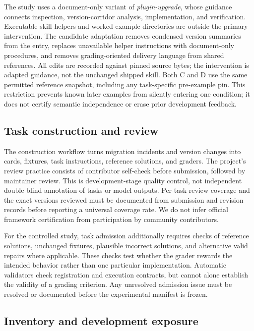 \documentclass[11pt]{article}
\begin{document}
The study uses a document-only variant of \emph{plugin-upgrade}, whose guidance connects inspection, version-corridor analysis, implementation, and verification.
Executable skill helpers and worked-example directories are outside the primary intervention.
The candidate adaptation removes condensed version summaries from the entry, replaces unavailable helper instructions with document-only procedures, and removes grading-oriented delivery language from shared references.
All edits are recorded against pinned source bytes; the intervention is adapted guidance, not the unchanged shipped skill.
Both C and D use the same permitted reference snapshot, including any task-specific pre-example pin.
This restriction prevents known later examples from silently entering one condition; it does not certify semantic independence or erase prior development feedback.

\subsection{Task construction and review}
\label{sec:pipeline}
\label{sec:qc}

The construction workflow turns migration incidents and version changes into cards, fixtures, task instructions, reference solutions, and graders.
The project's review practice consists of contributor self-check before submission, followed by maintainer review.
This is development-stage quality control, not independent double-blind annotation of tasks or model outputs.
Per-task review coverage and the exact versions reviewed must be documented from submission and revision records before reporting a universal coverage rate.
We do not infer official framework certification from participation by community contributors.

For the controlled study, task admission additionally requires checks of reference solutions, unchanged fixtures, plausible incorrect solutions, and alternative valid repairs where applicable.
These checks test whether the grader rewards the intended behavior rather than one particular implementation.
Automatic validators check registration and execution contracts, but cannot alone establish the validity of a grading criterion.
Any unresolved admission issue must be resolved or documented before the experimental manifest is frozen.

\subsection{Inventory and development exposure}
\label{sec:taxonomy}
\label{sec:teaching-to-test}
\end{document}
